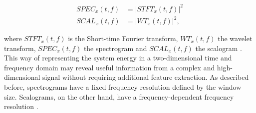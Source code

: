 \begin{equation}
    \begin{aligned}
        SPEC_{x}(t,f) &= |STFT_{x}(t,f)|^{2} \\
        SCAL_{x}(t,f) &= |WT_{x}(t,f)|^{2}, 
    \end{aligned}
\end{equation}

where $STFT_{x}(t,f)$ is the Short-time Fourier transform, $WT_{x}(t,f)$ the wavelet transform, $SPEC_{x}(t,f)$ the spectrogram and $SCAL_{x}(t,f)$ the scalogram \cite{Hlawatsch1992}. This way of representing the system energy in a two-dimensional time and frequency domain may reveal useful information from a complex and high-dimensional signal without requiring additional feature extraction. As described before, spectrograms have a fixed frequency resolution defined by the window size. Scalograms, on the other hand, have a frequency-dependent frequency resolution \cite{Verstraete2017}.

